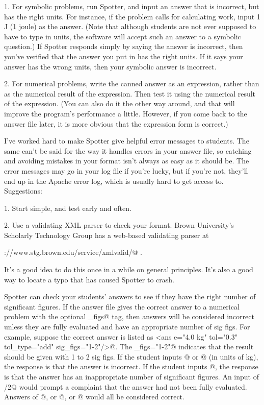 \documentclass{doc}
\begin{document}
1. For symbolic problems, run Spotter, and input an answer that is incorrect, but has the right units.
For instance, if the problem calls for calculating work, input 1 J (1 joule) as
the answer. (Note that although students are not ever supposed to have to type in
units, the software will accept such an answer to a symbolic question.) If Spotter
responds simply by saying the answer is incorrect, then you've verified that the
answer you put in has the right units. If it says your answer has the wrong units,
then your symbolic answer is incorrect.

2. For numerical problems, write the canned answer as an expression, rather than
as the numerical result of the expression. Then test it using the numerical
result of the expression. (You can also do it the other way around, and that will
improve the program's performance a little. However, if you come back to the answer
file later, it is more obvious that the expression form is correct.)


I've worked hard to make Spotter give helpful error messages to students. The same
can't be said for the way it handles errors in your answer file, so 
catching and avoiding mistakes in your format isn't always as easy as it should be.
The error messages
may go in your log file if you're lucky, but if you're not, they'll end up in the
Apache error log, which is usually hard to get access to. Suggestions:

1. Start simple, and test early and often.

2. Use a validating XML parser to check your format. Brown University's
Scholarly Technology Group has a web-based validating parser at

\noindent\verb@http://www.stg.brown.edu/service/xmlvalid/@ \qquad .

It's a good idea to do this once in a while on general principles. It's
also a good way to locate a typo that has caused Spotter to crash.

Spotter can check your students' answers to see if they have the right number of significant figures.
If the answer file gives the correct answer to a numerical problem with the optional
\verb@sig_figs@ tag, then answers will be considered incorrect unless they
are fully evaluated and have an appropriate number of sig figs. For example, suppose
the correct answer is listed as
\verb@<ans e="4.0 kg" tol="0.3" tol_type="add" sig_figs="1-2"/>@. The \verb@sig_figs="1-2"@
indicates that the result should be given with 1 to 2 sig figs.
If the student inputs @ or @ (in units of kg), the response is that the answer is incorrect.
If the student inputs @, the response is that the answer has an inappropriate number
of significant figures.
An input of /2@ would prompt a complaint that the answer had not been fully evaluated.
Answers of @, or @, or @ would all be considered correct.
\end{document}
